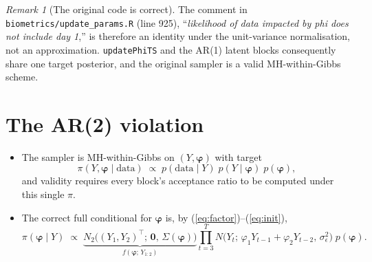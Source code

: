 \documentclass[11pt]{article}
\newcommand{\bZero}{\boldsymbol{0}}
\newcommand{\eref}[1]{(\ref{#1})}
\newcommand{\bphi}{\boldsymbol{\varphi}}
\theoremstyle{plain}
\theoremstyle{definition}
\theoremstyle{remark}
\newtheorem{remark}[proposition]{Remark}
\begin{document}
\begin{remark}[The original code is correct]\label{rem:orig}
The comment in \texttt{biometrics/update\_params.R} (line 925),
``\emph{likelihood of data impacted by phi does not include day 1},'' is
therefore an identity under the unit-variance normalisation, not an
approximation. \texttt{updatePhiTS} and the AR(1) latent blocks consequently
share one target posterior, and the original sampler is a valid
MH-within-Gibbs scheme.
\end{remark}

\section{The AR(2) violation}\label{sec:violation}

\begin{itemize}
  \item The sampler is MH-within-Gibbs on $(Y, \bphi)$ with target
        \begin{equation}\label{eq:target}
          \pi(Y, \bphi \mid \text{data})
          \;\propto\;
          p(\text{data} \mid Y)\; p(Y \mid \bphi)\; p(\bphi),
        \end{equation}
        and validity requires every block's acceptance ratio to be computed
        under this single $\pi$.
  \item The correct full conditional for $\bphi$ is, by
        \eref{eq:factor}--\eref{eq:init},
        \begin{equation}\label{eq:fullcond}
          \pi(\bphi \mid Y)
          \;\propto\;
          \underbrace{N_2\!\bigl( (Y_1, Y_2)^\top ;\, \bZero,\,
            \Sigma(\bphi) \bigr)}_{f(\bphi;\, Y_{1:2})}
          \prod_{t=3}^{T}
          N\!\bigl( Y_t ;\, \varphi_1 Y_{t-1} + \varphi_2 Y_{t-2},\,
                    \sigma_\epsilon^2 \bigr)
          \; p(\bphi).
        \end{equation}
\end{itemize}
\end{document}
